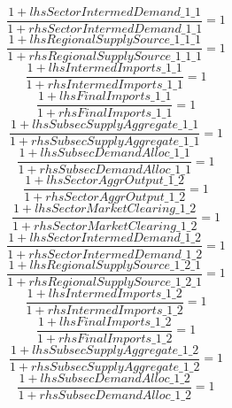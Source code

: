 \begin{dmath}
\frac{1+{lhsSectorIntermedDemand\_1\_1}}{1+{rhsSectorIntermedDemand\_1\_1}}=1
\end{dmath}
\begin{dmath}
\frac{1+{lhsRegionalSupplySource\_1\_1\_1}}{1+{rhsRegionalSupplySource\_1\_1\_1}}=1
\end{dmath}
\begin{dmath}
\frac{1+{lhsIntermedImports\_1\_1}}{1+{rhsIntermedImports\_1\_1}}=1
\end{dmath}
\begin{dmath}
\frac{1+{lhsFinalImports\_1\_1}}{1+{rhsFinalImports\_1\_1}}=1
\end{dmath}
\begin{dmath}
\frac{1+{lhsSubsecSupplyAggregate\_1\_1}}{1+{rhsSubsecSupplyAggregate\_1\_1}}=1
\end{dmath}
\begin{dmath}
\frac{1+{lhsSubsecDemandAlloc\_1\_1}}{1+{rhsSubsecDemandAlloc\_1\_1}}=1
\end{dmath}
\begin{dmath}
\frac{1+{lhsSectorAggrOutput\_1\_2}}{1+{rhsSectorAggrOutput\_1\_2}}=1
\end{dmath}
\begin{dmath}
\frac{1+{lhsSectorMarketClearing\_1\_2}}{1+{rhsSectorMarketClearing\_1\_2}}=1
\end{dmath}
\begin{dmath}
\frac{1+{lhsSectorIntermedDemand\_1\_2}}{1+{rhsSectorIntermedDemand\_1\_2}}=1
\end{dmath}
\begin{dmath}
\frac{1+{lhsRegionalSupplySource\_1\_2\_1}}{1+{rhsRegionalSupplySource\_1\_2\_1}}=1
\end{dmath}
\begin{dmath}
\frac{1+{lhsIntermedImports\_1\_2}}{1+{rhsIntermedImports\_1\_2}}=1
\end{dmath}
\begin{dmath}
\frac{1+{lhsFinalImports\_1\_2}}{1+{rhsFinalImports\_1\_2}}=1
\end{dmath}
\begin{dmath}
\frac{1+{lhsSubsecSupplyAggregate\_1\_2}}{1+{rhsSubsecSupplyAggregate\_1\_2}}=1
\end{dmath}
\begin{dmath}
\frac{1+{lhsSubsecDemandAlloc\_1\_2}}{1+{rhsSubsecDemandAlloc\_1\_2}}=1
\end{dmath}
